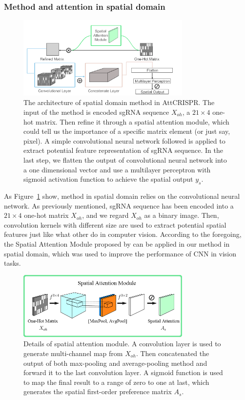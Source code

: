 \documentclass{bioinfo}
\begin{document}
\subsubsection{Method and attention in spatial domain}

\begin{figure}[!tpb]%
    \centerline{\includegraphics[width=86mm]{CNNv2.png}}
    \caption{The architecture of spatial domain method in AttCRISPR. 
    The input of the method is encoded sgRNA sequence $X_{oh}$, a $21\times 4$ one-hot matrix. 
    Then refine it through a spatial attention module, which could tell us the importance of a specific matrix element (or just say, pixel).
    A simple convolutional neural network followed is applied to extract potential feature representation of sgRNA sequence.
    In the last step, we flatten the output of convolutional neural network into a one dimensional vector and 
    use a multilayer perceptron with sigmoid activation function to achieve the spatial output $y_s$.}\label{fig:CNN}
\end{figure}
As Figure~\ref{fig:CNN} show, method in spatial domain relies on the convolutional neural network. 
As previously mentioned, sgRNA sequence has been encoded into a $21\times 4$ one-hot matrix $X_{oh}$, and we regard $X_{oh}$ as a binary image. 
Then, convolution kernels with different size are used to extract potential spatial features just like what other do in computer vision. 
According to the foregoing, the Spatial Attention Module proposed by \citeauthor{woo2018cbam:} can be applied in our method in spatial domain, 
which was used to improve the performance of CNN in vision tasks.

\begin{figure}[!tpb]%
    \centerline{\includegraphics[width=86mm]{spatialmodule.png}}
    \caption{Details of spatial attention module. A convolution layer is used to generate multi-channel map from $X_{oh}$.
    Then concatenated the output of both max-pooling and average-pooling method and forward it to the last convolution layer.
    A sigmoid function is used to map the final result to a range of zero to one at last, 
    which generates the spatial first-order preference matrix $A_s$.
    }\label{fig:spatialmodule}
\end{figure}
\end{document}
